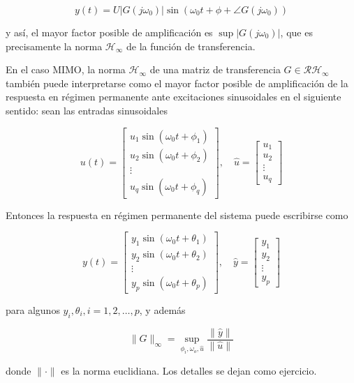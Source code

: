 $$
y(t)=U\left|G\left(j \omega_{0}\right)\right| \sin \left(\omega_{0} t+\phi+\angle G\left(j \omega_{0}\right)\right)
$$

y así, el mayor factor posible de amplificación es $\sup \left|G\left(j \omega_{0}\right)\right|$, que es precisamente la norma $\mathcal{H}_{\infty}$ de la función de transferencia.

En el caso MIMO, la norma $\mathcal{H}_{\infty}$ de una matriz de transferencia $G \in \mathcal{R} \mathcal{H}_{\infty}$ también puede interpretarse como el mayor factor posible de amplificación de la respuesta en régimen permanente ante excitaciones sinusoidales en el siguiente sentido: sean las entradas sinusoidales

$$
u(t)=\left[\begin{array}{c}
u_{1} \sin \left(\omega_{0} t+\phi_{1}\right) \\
u_{2} \sin \left(\omega_{0} t+\phi_{2}\right) \\
\vdots \\
u_{q} \sin \left(\omega_{0} t+\phi_{q}\right)
\end{array}\right], \quad \hat{u}=\left[\begin{array}{c}
u_{1} \\
u_{2} \\
\vdots \\
u_{q}
\end{array}\right]
$$

Entonces la respuesta en régimen permanente del sistema puede escribirse como

$$
y(t)=\left[\begin{array}{c}
y_{1} \sin \left(\omega_{0} t+\theta_{1}\right) \\
y_{2} \sin \left(\omega_{0} t+\theta_{2}\right) \\
\vdots \\
y_{p} \sin \left(\omega_{0} t+\theta_{p}\right)
\end{array}\right], \quad \hat{y}=\left[\begin{array}{c}
y_{1} \\
y_{2} \\
\vdots \\
y_{p}
\end{array}\right]
$$

para algunos $y_{i}, \theta_{i}, i=1,2, \ldots, p$, y además

$$
\|G\|_{\infty}=\sup _{\phi_{i}, \omega_{o}, \hat{u}} \frac{\|\hat{y}\|}{\|\hat{u}\|}
$$

donde $\|\cdot\|$ es la norma euclidiana. Los detalles se dejan como ejercicio.

